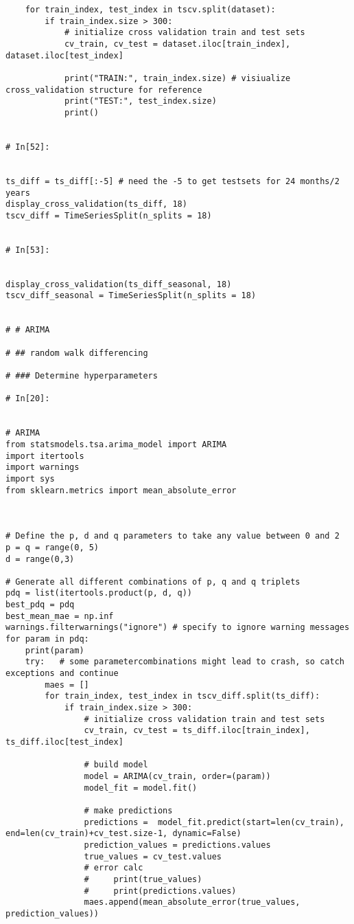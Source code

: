 \begin{verbatim}
    for train_index, test_index in tscv.split(dataset):
        if train_index.size > 300:
            # initialize cross validation train and test sets
            cv_train, cv_test = dataset.iloc[train_index], dataset.iloc[test_index]

            print("TRAIN:", train_index.size) # visiualize cross_validation structure for reference
            print("TEST:", test_index.size)
            print()


# In[52]:


ts_diff = ts_diff[:-5] # need the -5 to get testsets for 24 months/2 years
display_cross_validation(ts_diff, 18)
tscv_diff = TimeSeriesSplit(n_splits = 18)


# In[53]:


display_cross_validation(ts_diff_seasonal, 18)
tscv_diff_seasonal = TimeSeriesSplit(n_splits = 18)


# # ARIMA

# ## random walk differencing

# ### Determine hyperparameters

# In[20]:


# ARIMA
from statsmodels.tsa.arima_model import ARIMA
import itertools
import warnings
import sys
from sklearn.metrics import mean_absolute_error



# Define the p, d and q parameters to take any value between 0 and 2
p = q = range(0, 5)
d = range(0,3)

# Generate all different combinations of p, q and q triplets
pdq = list(itertools.product(p, d, q))
best_pdq = pdq
best_mean_mae = np.inf
warnings.filterwarnings("ignore") # specify to ignore warning messages
for param in pdq:
    print(param)
    try:   # some parametercombinations might lead to crash, so catch exceptions and continue
        maes = []
        for train_index, test_index in tscv_diff.split(ts_diff):
            if train_index.size > 300:
                # initialize cross validation train and test sets
                cv_train, cv_test = ts_diff.iloc[train_index], ts_diff.iloc[test_index]

                # build model
                model = ARIMA(cv_train, order=(param))
                model_fit = model.fit()

                # make predictions
                predictions =  model_fit.predict(start=len(cv_train), end=len(cv_train)+cv_test.size-1, dynamic=False)
                prediction_values = predictions.values
                true_values = cv_test.values
                # error calc
                #     print(true_values)
                #     print(predictions.values)
                maes.append(mean_absolute_error(true_values, prediction_values))


\end{verbatim}
